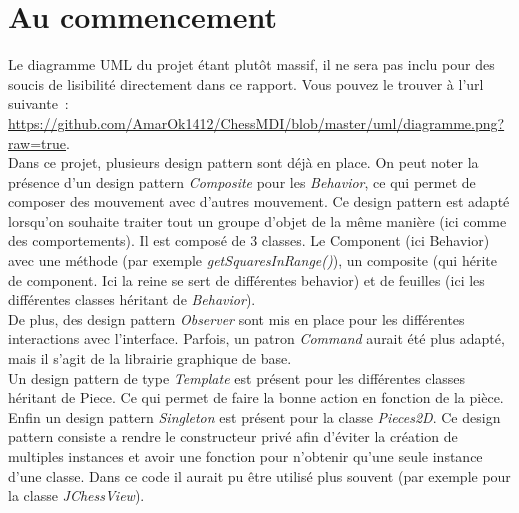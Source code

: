 \documentclass{article}
\begin{document}
	\section{Au commencement}
	\label{sec:Au commencement}
	Le diagramme UML du projet étant plutôt massif, il ne sera pas inclu pour des soucis de lisibilité directement dans ce rapport. Vous pouvez le trouver à l'url suivante~: \url{https://github.com/AmarOk1412/ChessMDI/blob/master/uml/diagramme.png?raw=true}.\\
	Dans ce projet, plusieurs design pattern sont déjà en place. On peut noter la présence d'un design pattern \emph{Composite} pour les \emph{Behavior}, ce qui permet de composer des mouvement avec d'autres mouvement. Ce design pattern est adapté lorsqu'on souhaite traiter tout un groupe d'objet de la même manière (ici comme des comportements). Il est composé de 3 classes. Le Component (ici Behavior) avec une méthode (par exemple \emph{getSquaresInRange()}), un composite (qui hérite de component. Ici la reine se sert de différentes behavior) et de feuilles (ici les différentes classes héritant de \emph{Behavior}).\\
	De plus, des design pattern \emph{Observer} sont mis en place pour les différentes interactions avec l'interface. Parfois, un patron \emph{Command} aurait été plus adapté, mais il s'agit de la librairie graphique de base.\\
	Un design pattern de type \emph{Template} est présent pour les différentes classes héritant de Piece. Ce qui permet de faire la bonne action en fonction de la pièce.\\
	Enfin un design pattern \emph{Singleton} est présent pour la classe \emph{Pieces2D}. Ce design pattern consiste a rendre le constructeur privé afin d'éviter la création de multiples instances et avoir une fonction pour n'obtenir qu'une seule instance d'une classe. Dans ce code il aurait pu être utilisé plus souvent (par exemple pour la classe \emph{JChessView}).
\end{document}
